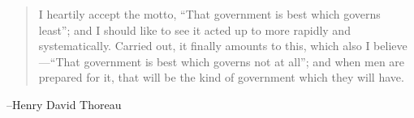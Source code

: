 \documentclass[letterpaper]{exam}
\begin{document}
  \else
    \vspace{11 cm}
    \begin{quote}
      \begin{em}
        I heartily accept the motto, ``That government is best which governs
        least''; and I should like to see it acted up to more rapidly and
        systematically. Carried out, it finally amounts to this, which also I
        believe---``That government is best which governs not at all''; and
        when men are prepared for it, that will be the kind of government which
        they will have.
      \end{em}
    \end{quote}
    \hspace{2 cm} --Henry David Thoreau
  \fi
\end{document}
